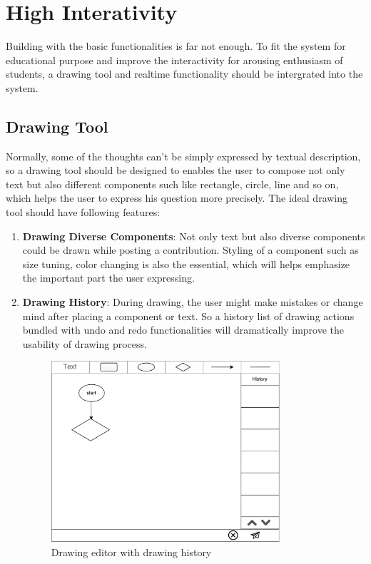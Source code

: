 \begin{enumerate}
\end{enumerate}


\section{High Interativity}
Building with the basic functionalities is far not enough. To fit the system for educational purpose and improve the interactivity for arousing enthusiasm of students, a drawing tool and realtime functionality should be intergrated into the system.

\subsection{Drawing Tool}
Normally, some of the thoughts can't be simply expressed by textual description, so a drawing tool should be designed to enables the user to compose not only text but also different components such like rectangle, circle, line and so on, which helps the user to express his question more precisely.
The ideal drawing tool should have following features:

\begin{enumerate}
\item
\textbf{Drawing Diverse Components}: Not only text but also diverse components could be drawn while posting a contribution. Styling of a component such as size tuning, color changing is also the essential, which will helps emphasize the important part the user expressing.

\item
\textbf{Drawing History}: During drawing, the user might make mistakes or change mind after placing a component or text. So a history list of drawing actions bundled with undo and redo functionalities will dramatically improve the usability of drawing process.

\begin{figure}[!htbp]
  \centering
    \includegraphics[width=0.8\textwidth]{Figures/mockup/editor.pdf}
  \caption{Drawing editor with drawing history}
\end{figure}


\end{enumerate}


